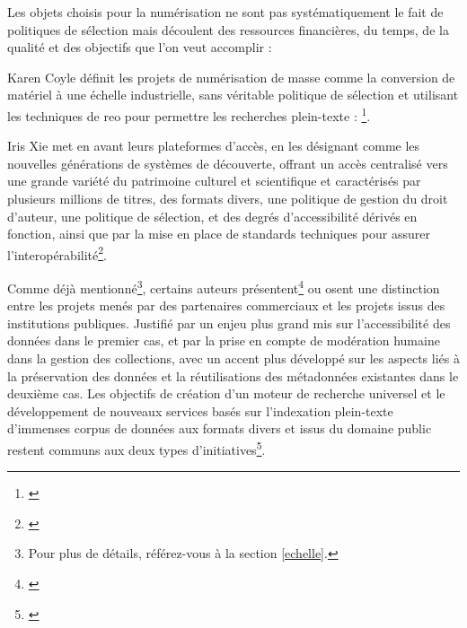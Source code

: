 Les objets choisis pour la numérisation ne sont pas systématiquement le fait de politiques de sélection mais découlent des ressources financières, du temps, de la qualité et des objectifs que l'on veut accomplir : 

Karen Coyle définit les projets de numérisation de masse comme la conversion de matériel à une échelle industrielle, sans véritable politique de sélection et utilisant les techniques de \gls{reo} pour permettre les recherches plein-texte : \footnote{\cite{coyle_mass_2006}}. 

Iris Xie met en avant leurs plateformes d'accès, en les désignant comme les nouvelles générations de systèmes de découverte, offrant un accès centralisé vers une grande variété du patrimoine culturel et scientifique et caractérisés par plusieurs millions de titres, des formats divers, une politique de gestion du droit d'auteur, une politique de sélection, et des degrés d'accessibilité dérivés en fonction, ainsi que par la mise en place de standards techniques pour assurer l'interopérabilité\footnote{\cite[p.23]{xie_discover_2016}}.

Comme déjà mentionné\footnote{Pour plus de détails, référez-vous à la section \ref{echelle}.}, certains auteurs présentent\footnote{\cite{jones_public_2017}} ou osent une distinction entre les projets menés par des partenaires commerciaux et les projets issus des institutions publiques. Justifié par un enjeu plus grand mis sur l'accessibilité des données dans le premier cas, et par la prise en compte de modération humaine dans la gestion des collections, avec un accent plus développé sur les aspects liés à la préservation des données et la réutilisations des métadonnées existantes dans le deuxième cas. Les objectifs de création d'un moteur de recherche universel et le développement de nouveaux services basés sur l'indexation plein-texte d'immenses corpus de données aux formats divers et issus du domaine public restent communs aux deux types d'initiatives\footnote{\cite[p.47]{lampert_ramping_2018}}. 

